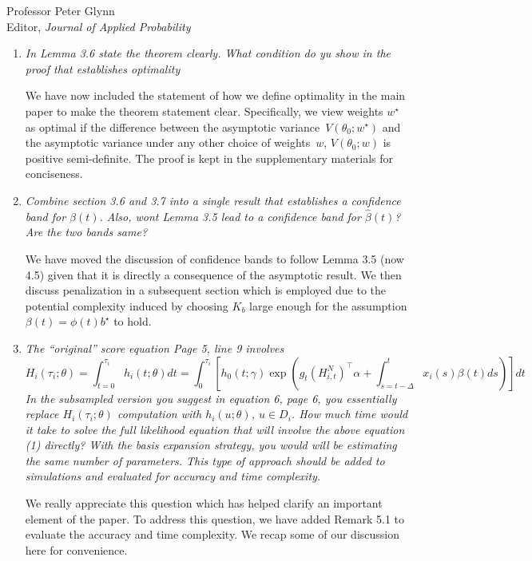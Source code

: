 \documentclass[11pt]{letter} %
\begin{document}
\begin{letter}{Professor
	Peter Glynn\\
	Editor, {\em Journal of Applied Probability}}
\begin{enumerate}
\item {\it In Lemma 3.6 state the theorem clearly.  What condition do yu show in the proof that establishes optimality}

\vspace{5mm}
We have now included the statement of how we define optimality in the main paper to make the theorem statement clear.  Specifically, we view weights $w^\star$ as optimal if the difference between the asymptotic variance~$V (\theta_0; w^\star)$ and the asymptotic variance under any other choice of weights~$w$, $V(\theta_0; w)$ is positive semi-definite. The proof is kept in the supplementary materials for conciseness.
\vspace{5mm}

\item {\it Combine section 3.6 and 3.7 into a single result that establishes a confidence band for $\beta (t)$. Also, wont Lemma 3.5 lead to a confidence band for $\hat \beta (t)$? Are the two bands same?}

\vspace{5mm}
We have moved the discussion of confidence bands to follow Lemma 3.5 (now 4.5) given that it is directly a consequence of the asymptotic result.  We then  discuss penalization in a subsequent section which is employed due to the potential complexity induced by choosing $K_b$ large enough for the assumption $\beta (t) =\phi (t) b^\star$ to hold.
\vspace{5mm}

\item {\it The ``original'' score equation Page 5, line 9 involves
$$
H_i (\tau_i ;\theta) = \int_{t=0}^{\tau_i} h_i (t; \theta)dt = \int_0^{\tau_i} \left[ h_0 (t;\gamma) \exp \left( g_t (H_{i,t}^N)^\top \alpha + \int_{s=t-\Delta}^t x_i (s) \beta(t) ds \right) \right] dt
$$
In the subsampled version you suggest in equation 6, page 6, you essentially replace $H_i (\tau_i; \theta)$ computation with $h_i (u; \theta)$, $u \in D_i$. How much time would it take to solve the full likelihood equation that will involve the above equation (1) directly? With the basis expansion strategy, you
would will be estimating the same number of parameters. This type of approach should be added to simulations and evaluated for accuracy and time complexity.}

\vspace{5mm}
We really appreciate this question which has helped clarify an important element of the paper.  To address this question, we have added Remark 5.1 to evaluate the accuracy and time complexity.  We recap some of our discussion here for convenience.
\vspace{5mm}


\end{enumerate}
\end{letter}
\end{document}
